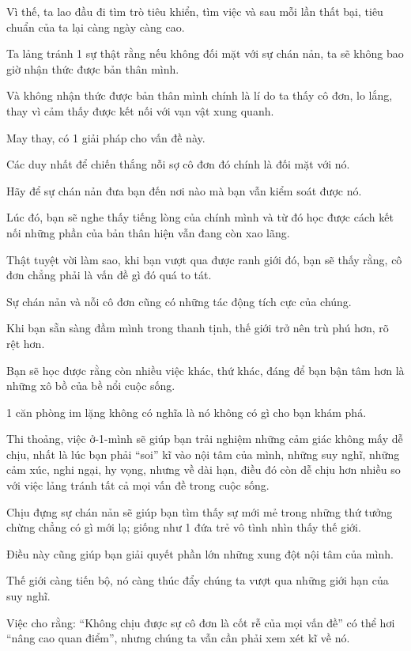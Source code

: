 \documentclass{article}
\begin{document}
Vì thế, ta lao đầu đi tìm trò tiêu khiển, tìm việc và sau mỗi lần thất bại, tiêu chuẩn của ta lại càng ngày càng cao.

Ta lảng tránh 1 sự thật rằng nếu không đối mặt với sự chán nản, ta sẽ không bao giờ nhận thức được bản thân mình.

Và không nhận thức được bản thân mình chính là lí do ta thấy cô đơn, lo lắng, thay vì cảm thấy được kết nối với vạn vật xung quanh.

%
May thay, có 1 giải pháp cho vấn đề này.

Các duy nhất để chiến thắng nỗi sợ cô đơn đó chính là đối mặt với nó.

Hãy để sự chán nản đưa bạn đến nơi nào mà bạn vẫn kiểm soát được nó.

Lúc đó, bạn sẽ nghe thấy tiếng lòng của chính mình và từ đó học được cách kết nối những phần của bản thân hiện vẫn đang còn xao lãng.

%
Thật tuyệt vời làm sao, khi bạn vượt qua được ranh giới đó, bạn sẽ thấy rằng, cô đơn chẳng phải là vấn đề gì đó quá to tát.

Sự chán nản và nỗi cô đơn cũng có những tác động tích cực của chúng.

Khi bạn sẵn sàng đầm mình trong thanh tịnh, thế giới trở nên trù phú hơn, rõ rệt hơn.

%
Bạn sẽ học được rằng còn nhiều việc khác, thứ khác, đáng để bạn bận tâm hơn là những xô bồ của bề nổi cuộc sống.

1 căn phòng im lặng không có nghĩa là nó không có gì cho bạn khám phá.

%
Thi thoảng, việc ở-1-mình sẽ giúp bạn trải nghiệm những cảm giác không mấy dễ chịu, nhất là lúc bạn phải ``soi'' kĩ vào nội tâm của mình, những suy nghĩ, những cảm xúc, nghi ngại, hy vọng, nhưng về dài hạn, điều đó còn dễ chịu hơn nhiều so với việc lảng tránh tất cả mọi vấn đề trong cuộc sống.

%
Chịu đựng sự chán nản sẽ giúp bạn tìm thấy sự mới mẻ trong những thứ tưởng chừng chẳng có gì mới lạ; giống như 1 đứa trẻ vô tình nhìn thấy thế giới.

Điều này cũng giúp bạn giải quyết phần lớn những xung đột nội tâm của mình.

%
Thế giới càng tiến bộ, nó càng thúc đẩy chúng ta vượt qua những giới hạn của suy nghĩ.

Việc cho rằng: ``Không chịu được sự cô đơn là cốt rễ của mọi vấn đề'' có thể hơi ``nâng cao quan điểm'', nhưng chúng ta vẫn cần phải xem xét kĩ về nó.
\end{document}
